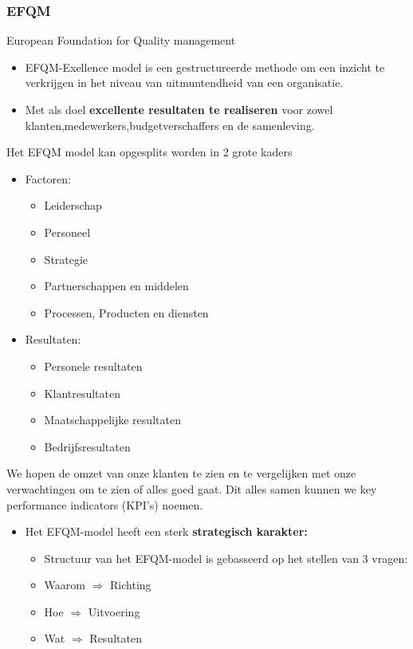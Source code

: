 \documentclass[12pt]{article}
\begin{document}
\subsubsection{EFQM}
European Foundation for Quality management\begin{itemize}
    \item EFQM-Exellence model is een gestructureerde methode om een inzicht te verkrijgen in het niveau van uitmuntendheid van een organisatie.
    \item Met als doel \textbf{excellente resultaten te realiseren} voor zowel klanten,medewerkers,budgetverschaffers en de samenleving.
\end{itemize}
Het EFQM model kan opgesplits worden in 2 grote kaders \begin{itemize}
    \item Factoren:\begin{itemize}
        \item Leiderschap
        \item Personeel
        \item Strategie
        \item Partnerschappen en middelen
        \item Processen, Producten en diensten
    \end{itemize}
    \item Resultaten:\begin{itemize}
        \item Personele resultaten
        \item Klantresultaten
        \item Maatschappelijke resultaten
        \item Bedrijfsresultaten
    \end{itemize}
\end{itemize}
We hopen de omzet van onze klanten te zien en te vergelijken met onze verwachtingen om te zien of alles goed gaat. Dit alles samen kunnen we key performance indicators (KPI's) noemen.
\begin{itemize}
    \item[] Het EFQM-model heeft een sterk \textbf{strategisch karakter:}\begin{itemize}
    \item[] Structuur van het EFQM-model is gebasseerd op het stellen van 3 vragen:
        \item Waarom $\Rightarrow$ Richting
        \item Hoe $\Rightarrow$ Uitvoering
        \item Wat $\Rightarrow$ Resultaten
    \end{itemize}
\end{itemize}
\end{document}
